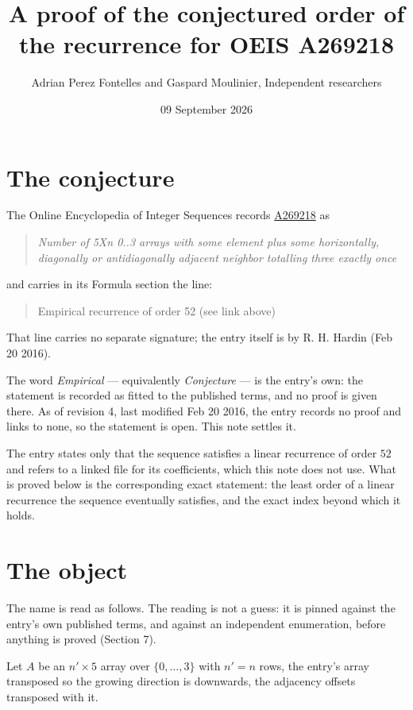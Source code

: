 \documentclass[11pt]{article}
\title{A proof of the conjectured order of the recurrence for OEIS A269218}
\author{Adrian Perez Fontelles and Gaspard Moulinier, Independent researchers}
\date{09 September 2026}
\theoremstyle{definition}
\begin{document}
\maketitle
\section{The conjecture}

The Online Encyclopedia of Integer Sequences records \href{https://oeis.org/A269218}{A269218} as

\begin{quote}\itshape Number of 5Xn 0..3 arrays with some element plus some horizontally, diagonally or antidiagonally adjacent neighbor totalling three exactly once\end{quote}

and carries in its Formula section the line:

\begin{quote}\ttfamily Empirical recurrence of order 52 (see link above)\end{quote}

That line carries no separate signature; the entry itself is by R. H. Hardin (Feb 20 2016).

The word {\itshape Empirical} --- equivalently {\itshape Conjecture} --- is the entry's own: the statement is recorded as fitted to the published terms, and no proof is given there. As of revision 4, last modified Feb 20 2016, the entry records no proof and links to none, so the statement is open. This note settles it.

The entry states only that the sequence satisfies a linear recurrence of order $52$ and refers to a linked file for its coefficients, which this note does not use. What is proved below is the corresponding exact statement: the least order of a linear recurrence the sequence eventually satisfies, and the exact index beyond which it holds.

\section{The object}

The name is read as follows. The reading is not a guess: it is pinned against the entry's own published terms, and against an independent enumeration, before anything is proved (Section 7).

Let $A$ be an $n' \times 5$ array over $\{0,\dots,3\}$ with $n' = n$ rows, the entry's array transposed so the growing direction is downwards, the adjacency offsets transposed with it.
\end{document}
